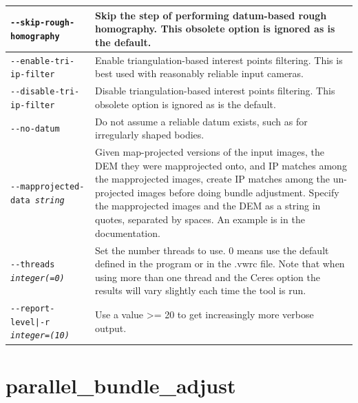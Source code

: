\begin{longtable}{|p{8cm}|p{9cm}|}
\texttt{-\/-skip-rough-homography} & 
Skip the step of performing datum-based rough homography. This obsolete option is ignored as is the default.\\ \hline

\texttt{-\/-enable-tri-ip-filter} & 
Enable triangulation-based interest points filtering. This is best used with reasonably reliable input cameras.
\\ \hline

\texttt{-\/-disable-tri-ip-filter} & 
Disable triangulation-based interest points filtering. This obsolete option is ignored as is the default.
\\ \hline

\texttt{-\/-no-datum} & 
Do not assume a reliable datum exists, such as for irregularly shaped bodies.
\\ \hline


\texttt{-\/-mapprojected-data \textit{string}} &
Given map-projected versions of the input images, the DEM they were mapprojected onto, and IP matches among the mapprojected images, create IP matches among the un-projected images before doing bundle adjustment. Specify the mapprojected images and the DEM as a string in quotes, separated by spaces. An example is in the documentation.
\\ \hline

\texttt{-\/-threads \textit{integer(=0)}} & Set the number threads to use. 0 means use the default defined in the program or in the .vwrc file. Note that when using more than one thread and the Ceres option the results will vary slightly each time the tool is run. \\ \hline

\texttt{-\/-report-level|-r \textit{integer=(10)}} & Use a value >= 20 to
get increasingly more verbose output. \\ \hline
\end{longtable}


\section{parallel\_bundle\_adjust}
\label{parallelbundleadjust}

